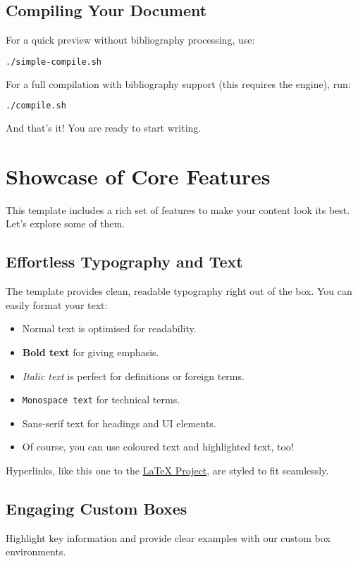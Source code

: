 \documentclass[a4paper,11pt]{report}
\begin{document}
\section{Compiling Your Document}
\label{sec:compilation}
For a quick preview without bibliography processing, use:
\begin{lstlisting}[language=bash]
./simple-compile.sh
\end{lstlisting}

For a full compilation with bibliography support (this requires the  engine), run:
\begin{lstlisting}[language=bash]
./compile.sh
\end{lstlisting}

And that's it! You are ready to start writing.

\chapter{Showcase of Core Features}
\label{chap:features}
This template includes a rich set of features to make your content look its best. Let's explore some of them.

\section{Effortless Typography and Text}
The template provides clean, readable typography right out of the box. You can easily format your text:

\begin{itemize}
    \item Normal text is optimised for readability.
    \item \textbf{Bold text} for giving emphasis.
    \item \textit{Italic text} is perfect for definitions or foreign terms.
    \item \texttt{Monospace text} for technical terms.
    \item \textsf{Sans-serif text} for headings and UI elements.
    \item Of course, you can use \textcolor{accentcolor}{coloured text} and \textcolor{highlightcolor}{highlighted text}, too!
\end{itemize}

Hyperlinks, like this one to the \href{https://www.latex-project.org/}{LaTeX Project}, are styled to fit seamlessly.

\section{Engaging Custom Boxes}
Highlight key information and provide clear examples with our custom box environments.
\end{document}
